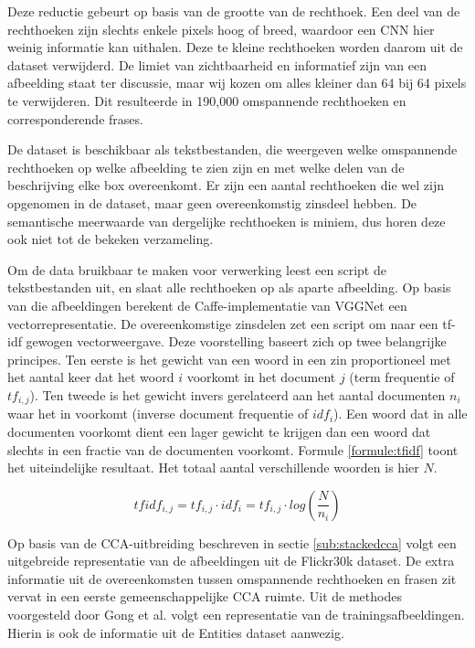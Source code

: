 Deze reductie gebeurt op basis van de grootte van de rechthoek. Een deel van de rechthoeken zijn slechts enkele pixels hoog of breed, waardoor een CNN hier weinig informatie kan uithalen. Deze te kleine rechthoeken worden daarom uit de dataset verwijderd. De limiet van zichtbaarheid en informatief zijn van een afbeelding staat ter discussie, maar wij kozen om alles kleiner dan 64 bij 64 pixels te verwijderen. Dit resulteerde in 190,000 omspannende rechthoeken en corresponderende frases. 

De dataset is beschikbaar als tekstbestanden, die weergeven welke omspannende rechthoeken op welke afbeelding te zien zijn en met welke delen van de beschrijving elke box overeenkomt. Er zijn een aantal rechthoeken die wel zijn opgenomen in de dataset, maar geen overeenkomstig zinsdeel hebben. De semantische meerwaarde van dergelijke rechthoeken is miniem, dus horen deze ook niet tot de bekeken verzameling. 

Om de data bruikbaar te maken voor verwerking leest een script de tekstbestanden uit, en slaat alle rechthoeken op als aparte afbeelding. Op basis van die afbeeldingen berekent de Caffe-implementatie van VGGNet een vectorrepresentatie. De overeenkomstige zinsdelen zet een script om naar een tf-idf gewogen vectorweergave. Deze voorstelling baseert zich op twee belangrijke principes. Ten eerste is het gewicht van een woord in een zin proportioneel met het aantal keer dat het woord $i$ voorkomt in het document $j$ (term frequentie of $tf_{i,j}$). Ten tweede is het gewicht invers gerelateerd aan het aantal documenten $n_i$ waar het in voorkomt (inverse document frequentie of $idf_i$). Een woord dat in alle documenten voorkomt dient een lager gewicht te krijgen dan een woord dat slechts in een fractie van de documenten voorkomt. Formule \ref{formule:tfidf} toont het uiteindelijke resultaat. Het totaal aantal verschillende woorden is hier $N$\cite{Jurafsky:2009:SLP:1214993}. 

\begin{equation}
\label{formule:tfidf}
	tfidf_{i,j} = tf_{i,j}\cdot{idf_{i}} = tf_{i,j}\cdot{log(\frac{N}{n_i})}
\end{equation}

Op basis van de CCA-uitbreiding beschreven in sectie \ref{sub:stackedcca} volgt een uitgebreide representatie van de afbeeldingen uit de Flickr30k dataset. De extra informatie uit de overeenkomsten tussen omspannende rechthoeken en frasen zit vervat in een eerste gemeenschappelijke CCA ruimte. Uit de methodes voorgesteld door Gong et al.\cite{Gong2014} volgt een representatie van de trainingsafbeeldingen. Hierin is ook de informatie uit de Entities dataset aanwezig.

